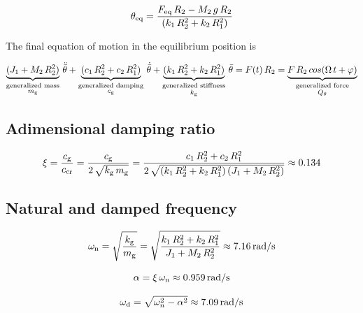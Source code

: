 \documentclass[a4paper,12pt,oneside]{article}
\begin{document}
\[
	\theta_\textup{eq} =
		\frac{F_\textup{eq} \, R_2 - M_2 \, g \, R_2}{(k_1 \, R_2^2 + k_2 \, R_1^2)}
\]

The final equation of motion in the equilibrium position is

\begin{equation}
\label{eqn:motion}
	\underbrace{(J_1 + M_2 \, R_2^2)}_
		{\substack{\text{generalized mass} \\ \text{$ m_\textup{g} $}}} \,
		\ddot{\bar{\theta}} +	\underbrace{(c_1 \, R_2^2 + c_2 \, R_1^2)}_
		{\substack{\text{generalized damping} \\ \text{$ c_\textup{g} $}}} \,
		\dot{\bar{\theta}} + \underbrace{(k_1 \, R_2^2 + k_2 \, R_1^2)}_
		{\substack{\text{generalized stiffness} \\ \text{$ k_\textup{g} $}}} \,
		\bar{\theta} = F(t) \, R_2 =
		\underbrace{F \, R_2 \, cos(\Omega \, t + \varphi)}_
		{\substack{\text{generalized force} \\ \text{$ Q_\theta $}}}
\end{equation}

\subsection{Adimensional damping ratio}

\begin{equation}
\label{eqn:damping_ratio}
	\xi = \frac{c_\textup{g}}{c_\textup{cr}} =
		\frac{c_\textup{g}}{2 \, \sqrt{k_\textup{g} \, m_\textup{g}}}
		= \frac{c_1 \, R_2^2 + c_2 \, R_1^2}
		{2 \, \sqrt{(k_1 \, R_2^2 + k_2 \, R_1^2) \, (J_1 + M_2 \, R_2^2)}}
		\approx 0.134
\end{equation}

\subsection{Natural and damped frequency}

\[
	\omega_\textup{n} = \sqrt{\frac{k_\textup{g}}{m_\textup{g}}} =
		\sqrt{\frac{k_1 \, R_2^2 + k_2 \, R_1^2}{J_1 + M_2 \, R_2^2}}
		\approx 7.16 \, \text{rad/s}
\]

\begin{equation}
\label{eqn:damping_factor}
  \alpha = \xi \, \omega_\textup{n} \approx 0.959 \, \text{rad/s}
\end{equation}

\begin{equation}
\label{eqn:damped_frequency}
	\omega_\textup{d} = \sqrt{\omega_n^2 - \alpha^2} \approx 7.09 \, \text{rad/s}
\end{equation}
\end{document}
